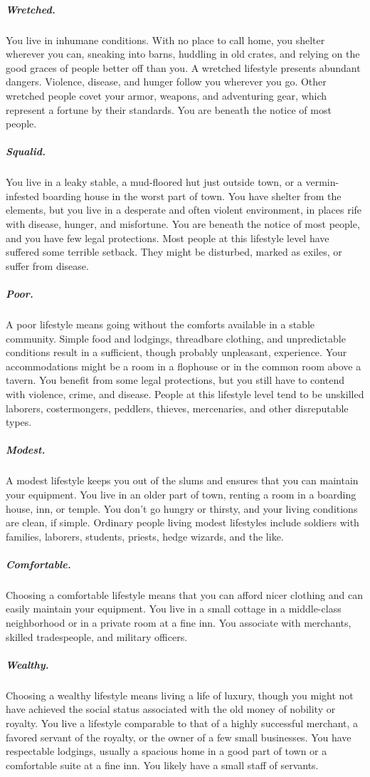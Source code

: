 \subparagraph*{Wretched.} You live in inhumane conditions. With no place to call home, you shelter wherever you can, sneaking into barns, huddling in old crates, and relying on the good graces of people better off than you. A wretched lifestyle presents abundant dangers. Violence, disease, and hunger follow you wherever you go. Other wretched people covet your armor, weapons, and adventuring gear, which represent a fortune by their standards. You are beneath the notice of most people.

\subparagraph*{Squalid.} You live in a leaky stable, a mud-floored hut just outside town, or a vermin-infested boarding house in the worst part of town. You have shelter from the elements, but you live in a desperate and often violent environment, in places rife with disease, hunger, and misfortune. You are beneath the notice of most people, and you have few legal protections. Most people at this lifestyle level have suffered some terrible setback. They might be disturbed, marked as exiles, or suffer from disease.

\subparagraph*{Poor.} A poor lifestyle means going without the comforts available in a stable community. Simple food and lodgings, threadbare clothing, and unpredictable conditions result in a sufficient, though probably unpleasant, experience. Your accommodations might be a room in a flophouse or in the common room above a tavern. You benefit from some legal protections, but you still have to contend with violence, crime, and disease. People at this lifestyle level tend to be unskilled laborers, costermongers, peddlers, thieves, mercenaries, and other disreputable types.

\subparagraph*{Modest.} A modest lifestyle keeps you out of the slums and ensures that you can maintain your equipment. You live in an older part of town, renting a room in a boarding house, inn, or temple. You don't go hungry or thirsty, and your living conditions are clean, if simple. Ordinary people living modest lifestyles include soldiers with families, laborers, students, priests, hedge wizards, and the like.

\subparagraph*{Comfortable.} Choosing a comfortable lifestyle means that you can afford nicer clothing and can easily maintain your equipment. You live in a small cottage in a middle-class neighborhood or in a private room at a fine inn. You associate with merchants, skilled tradespeople, and military officers.

\subparagraph*{Wealthy.} Choosing a wealthy lifestyle means living a life of luxury, though you might not have achieved the social status associated with the old money of nobility or royalty. You live a lifestyle comparable to that of a highly successful merchant, a favored servant of the royalty, or the owner of a few small businesses. You have respectable lodgings, usually a spacious home in a good part of town or a comfortable suite at a fine inn. You likely have a small staff of servants.


